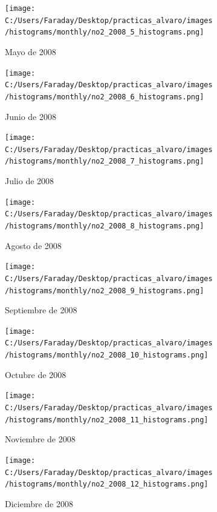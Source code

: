 \documentclass[12pt]{article}
\begin{document}
\begin{figure}[H]
\centering
\begin{subfigure}[h]{0.45\textwidth}
\texttt{[image: C:/Users/Faraday/Desktop/practicas\_alvaro/images/histograms/monthly/no2\_2008\_5\_histograms.png]}
\caption{Mayo de 2008}
\label{fig:hist-mon-1-5-2008}
\end{subfigure}
%
\begin{subfigure}[H]{0.45\textwidth}
\texttt{[image: C:/Users/Faraday/Desktop/practicas\_alvaro/images/histograms/monthly/no2\_2008\_6\_histograms.png]}
\caption{Junio de 2008}
\label{fig:hist-mon-1-6-2008}
\end{subfigure}
\caption{}
\end{figure}

\newpage

\begin{figure}[H]
\centering
\begin{subfigure}[h]{0.45\textwidth}
\texttt{[image: C:/Users/Faraday/Desktop/practicas\_alvaro/images/histograms/monthly/no2\_2008\_7\_histograms.png]}
\caption{Julio de 2008}
\label{fig:hist-mon-1-7-2008}
\end{subfigure}
%
\begin{subfigure}[H]{0.45\textwidth}
\texttt{[image: C:/Users/Faraday/Desktop/practicas\_alvaro/images/histograms/monthly/no2\_2008\_8\_histograms.png]}
\caption{Agosto de 2008}
\label{fig:hist-mon-1-8-2008}
\end{subfigure}
\caption{}
\end{figure}

\begin{figure}[H]
\centering
\begin{subfigure}[h]{0.45\textwidth}
\texttt{[image: C:/Users/Faraday/Desktop/practicas\_alvaro/images/histograms/monthly/no2\_2008\_9\_histograms.png]}
\caption{Septiembre de 2008}
\label{fig:hist-mon-1-9-2008}
\end{subfigure}
%
\begin{subfigure}[H]{0.45\textwidth}
\texttt{[image: C:/Users/Faraday/Desktop/practicas\_alvaro/images/histograms/monthly/no2\_2008\_10\_histograms.png]}
\caption{Octubre de 2008}
\label{fig:hist-mon-1-10-2008}
\end{subfigure}
\caption{}
\end{figure}

\begin{figure}[H]
\centering
\begin{subfigure}[h]{0.45\textwidth}
\texttt{[image: C:/Users/Faraday/Desktop/practicas\_alvaro/images/histograms/monthly/no2\_2008\_11\_histograms.png]}
\caption{Noviembre de 2008}
\label{fig:hist-mon-1-11-2008}
\end{subfigure}
%
\begin{subfigure}[H]{0.45\textwidth}
\texttt{[image: C:/Users/Faraday/Desktop/practicas\_alvaro/images/histograms/monthly/no2\_2008\_12\_histograms.png]}
\caption{Diciembre de 2008}
\label{fig:hist-mon-1-12-2008}
\end{subfigure}
\caption{}
\end{figure}
\end{document}
